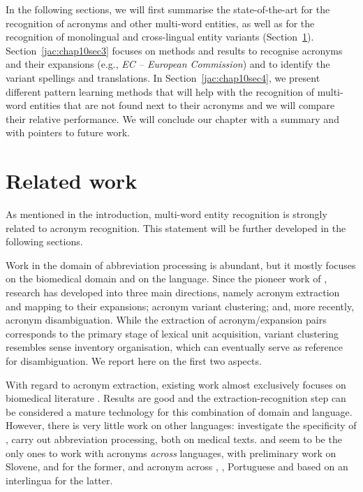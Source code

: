 \documentclass[output=paper]{langsci/langscibook}
\begin{document}
In the following sections, we will first summarise the state-of-the-art for the recognition of acronyms and other multi-word entities, as well as for the recognition of monolingual and cross-lingual entity variants (Section~\ref{jac:soa}). Section~\ref{jac:chap10sec3} focuses on methods and results to recognise acronyms and their expansions (e.g., \textit{EC – European Commission}) and to identify the variant spellings and translations. In Section~\ref{jac:chap10sec4}, we present different pattern learning methods that will help with the recognition of multi-word entities that are not found next to their acronyms and we will compare their relative performance. We will conclude our chapter with a summary and with pointers to future work. 

\section{Related work}
\label{jac:soa}
As mentioned in the introduction, multi-word entity recognition is
strongly related to acronym recognition. This statement will be
further developed in the following sections.

Work in the domain of abbreviation processing is abundant, but it
mostly focuses on the biomedical domain and on the 
language. Since the pioneer work of \citet{taghva-99}, research has
developed into three main directions, namely acronym extraction and
mapping to their expansions; acronym variant clustering; and, more
recently, acronym disambiguation. While the extraction of
acronym/expansion pairs corresponds to the primary stage of lexical
unit acquisition, variant clustering resembles sense inventory
organisation, which can eventually serve as reference for
disambiguation. We report here on the first two aspects.%

With regard to acronym extraction, existing work almost exclusively
focuses on  biomedical literature
\citep{schwartz-03,okazaki-06,pustejovsky-01,wren-02,adar-04,chang-02,nadeau-05}.
Results are good and the extraction-recognition step can be considered
a mature technology for this combination of domain and
language. However, there is very little work on other languages:
\citet{kokkinakis-06} investigate the specificity of ,
\citet{siklosi-14} carry out  abbreviation processing, both
on medical texts.  \citet{kompara-10} and \citet{hahn-05} seem to be
the only ones to work with acronyms \emph{across} languages, with
preliminary work on Slovene,  and  for the former, and
acronym  across , , Portuguese and  based
on an interlingua for the latter.
\end{document}

